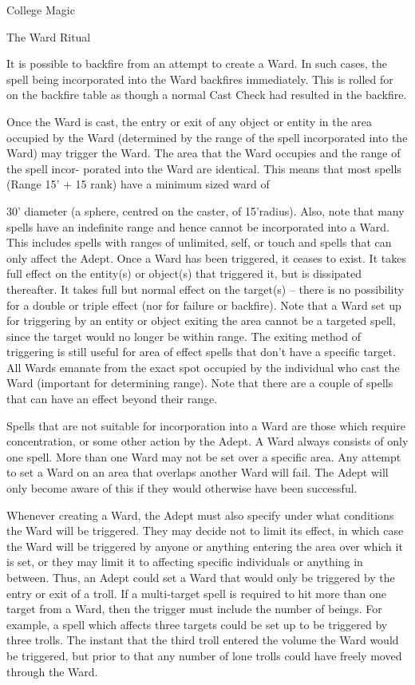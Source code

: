 \begin{Chapter}{College Magic}
\begin{ritual}{The Ward Ritual}
\begin{effects}
It is possible to backfire from an attempt to create a Ward.  In such
cases, the spell being incorporated into the Ward backfires
immediately. This is rolled for on the backfire table as though a
normal Cast Check had resulted in the backfire.

Once the Ward is cast, the entry or exit of any object or entity in
the area occupied by the Ward (determined by the range of the spell
incorporated into the Ward) may trigger the Ward. The area that the
Ward occupies and the range of the spell incor- porated into the Ward
are identical.  This means that most spells (Range 15’ + 15 rank) have
a minimum sized ward of

30’ diameter (a sphere, centred on the caster, of 15’radius).  Also,
note that many spells have an indefinite range and hence cannot be
incorporated into a Ward.  This includes spells with ranges of
unlimited, self, or touch and spells that can only affect the
Adept. Once a Ward has been triggered, it ceases to exist. It takes
full effect on the entity(s) or object(s) that triggered it, but is
dissipated thereafter.  It takes full but normal effect on the
target(s) – there is no possibility for a double or triple effect (nor
for failure or backfire).  Note that a Ward set up for triggering by
an entity or object exiting the area cannot be a targeted spell, since
the target would no longer be within range.  The exiting method of
triggering is still useful for area of effect spells that don’t have a
specific target.  All Wards emanate from the exact spot occupied by
the individual who cast the Ward (important for determining range).
Note that there are a couple of spells that can have an effect beyond
their range.

Spells that are not suitable for incorporation into a Ward are those
which require concentration, or some other action by the Adept.  A
Ward always consists of only one spell.  More than one Ward may not be
set over a specific area. Any attempt to set a Ward on an area that
overlaps another Ward will fail. The Adept will only become aware of
this if they would otherwise have been successful.

Whenever creating a Ward, the Adept must also specify under what
conditions the Ward will be triggered.  They may decide not to limit
its effect, in which case the Ward will be triggered by anyone or
anything entering the area over which it is set, or they may limit it
to affecting specific individuals or anything in between.  Thus, an
Adept could set a Ward that would only be triggered by the entry or
exit of a troll.  If a multi-target spell is required to hit more than
one target from a Ward, then the trigger must include the number of
beings.  For example, a spell which affects three targets could be set
up to be triggered by three trolls. The instant that the third troll
entered the volume the Ward would be triggered, but prior to that any
number of lone trolls could have freely moved through the Ward.


\end{effects}
\end{ritual}
\end{Chapter}
